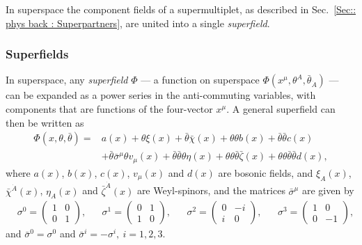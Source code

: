 \documentclass[twoside,english]{uiofysmaster}
\begin{document}
In superspace the component fields of a supermultiplet, as described in Sec.~\ref{Sec:: phys back : Superpartners}, are united into a single \textit{superfield}.


\subsubsection{Superfields}

In superspace, any \textit{superfield }$\Phi$ --- a function on superspace $\Phi(x^{\mu}, \theta^A, \bar{\theta}_{\dot{A}})$  --- can be expanded as a power series in the anti-commuting variables, with components that are functions of the four-vector $x^{\mu}$. A general superfield  can then be written as 
\begin{align}\label{Eq:: phys back : Superfield general}
\Phi(x, \theta, \bar{\theta}) =& a(x) + \theta \xi(x) + \bar{\theta}\bar{\chi}(x) + \theta \theta b(x) + \bar{\theta} \bar{\theta} c(x)\nonumber \\
 &+ \bar{\theta} \bar{\sigma}^{\mu} \theta v_{\mu}(x) + \bar{\theta} \bar{\theta} \theta \eta(x) + \theta \theta \bar{\theta} \bar{\zeta}(x) + \theta \theta \bar{\theta} \bar{\theta} d(x) , 
\end{align}
where $a(x)$, $b(x)$, $c(x)$, $v_{\mu}(x)$ and $d(x)$ are bosonic fields, and $\xi_A(x)$, $\bar{\chi}^{\dot{A}}(x)$, $\eta_A(x)$ and $\bar{\zeta}^{\dot{A}}(x)$ are Weyl-spinors, and the matrices $\bar{\sigma}^{\mu}$ are given by
\begin{align}
&\sigma^0 =  \begin{pmatrix}
1 & 0\\
0 & 1
\end{pmatrix},
&& \sigma^1 =  \begin{pmatrix}
0 & 1\\
1 & 0
\end{pmatrix},
&& \sigma^2 =  \begin{pmatrix}
0 & -i\\
i & 0
\end{pmatrix},
&& \sigma^3 = \begin{pmatrix}
1 & 0\\
0 & -1
\end{pmatrix},
\end{align}
and $\bar{\sigma}^0 = \sigma^0$ and $\bar{\sigma}^i = -\sigma^i,~i=1,2,3$.
\end{document}
